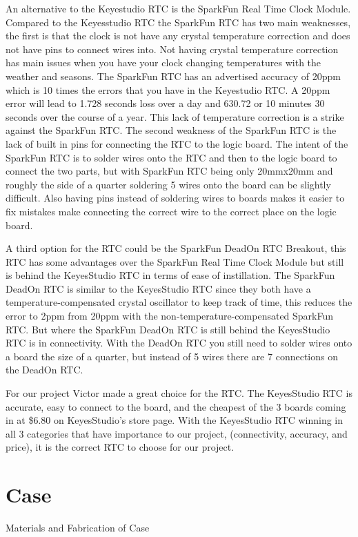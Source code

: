 \documentclass[10pt,draftclsnofoot,onecolumn]{IEEEtran}
\begin{document}
An alternative to the Keyestudio RTC is the SparkFun Real Time Clock Module. Compared to the Keyesstudio RTC the SparkFun RTC has two main weaknesses, the first is that the clock is not have any crystal temperature correction and does not have pins to connect wires into. Not having crystal temperature correction has main issues when you have your clock changing temperatures with the weather and seasons. The SparkFun RTC has an advertised accuracy of 20ppm which is 10 times the errors that you have in the Keyestudio RTC. A 20ppm error will lead to 1.728 seconds loss over a day and 630.72 or 10 minutes 30 seconds over the course of a year. This lack of temperature correction is a strike against the SparkFun RTC. The second weakness of the SparkFun RTC is the lack of built in pins for connecting the RTC to the logic board. The intent of the SparkFun RTC is to solder wires onto the RTC and then to the logic board to connect the two parts, but with SparkFun RTC being only 20mmx20mm and roughly the side of a quarter \cite{sfRTC} soldering 5 wires onto the board can be slightly difficult. Also having pins instead of soldering wires to boards makes it easier to fix mistakes make connecting the correct wire to the correct place on the logic board. 

A third option for the RTC could be the SparkFun DeadOn RTC Breakout, this RTC has some advantages over the SparkFun Real Time Clock Module but still is behind the KeyesStudio RTC in terms of ease of instillation. The SparkFun DeadOn RTC is similar to the KeyesStudio RTC since they both have a temperature-compensated crystal oscillator to keep track of time, this reduces the error to 2ppm \cite{sfDeadOn} from 20ppm with the non-temperature-compensated SparkFun RTC. But where the SparkFun DeadOn RTC is still behind the KeyesStudio RTC is in connectivity. With the DeadOn RTC you still need to solder wires onto a board the size of a quarter, but instead of 5 wires there are 7 connections on the DeadOn RTC. 

For our project Victor made a great choice for the RTC. The KeyesStudio RTC is accurate, easy to connect to the board, and the cheapest of the 3 boards coming in at \$6.80 on KeyesStudio’s store page. With the KeyesStudio RTC winning in all 3 categories that have importance to our project, (connectivity, accuracy, and price), it is the correct RTC to choose for our project. 

\newpage
\section{Case}
Materials and Fabrication of Case
\end{document}
